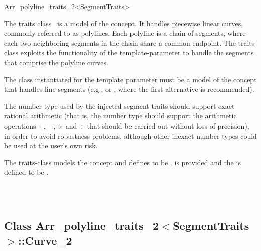 
\ccRefPageBegin
\begin{ccRefClass}{Arr_polyline_traits_2<SegmentTraits>}

\ccDefinition

The traits class \ccRefName\ is a model of the 
concept. It handles piecewise linear curves, commonly referred to as
polylines. Each polyline is a chain of segments, where each two neighboring
segments in the chain share a common endpoint. The traits class exploits the
functionality of the  template-parameter to handle the
segments that comprise the polyline curves.

The class instantiated for the template parameter  must
be a model of the  concept that handles line
segments (e.g.,  or 
, where the first
alternative is recommended).

The number type used by the injected segment traits should support exact
rational arithmetic (that is, the number type should support
the arithmetic operations $+$, $-$, $\times$ and $\div$ that should be
carried out without loss of precision), in order to avoid robustness
problems, although other inexact number types could be used at the user's
own risk.

The traits-class models the  concept
and defines  to
be .
 is provided and the 
is defined to be .


\ccIsModel
  \\
  \\

\subsection*{Class Arr\_polyline\_traits\_2$<$SegmentTraits$>$::Curve\_2}


\end{ccRefClass}
